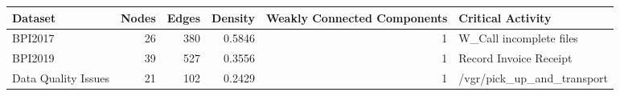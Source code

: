 \begin{tabular}{lrrrrl}
\toprule
Dataset & Nodes & Edges & Density & Weakly Connected Components & Critical Activity \\
\midrule
BPI2017 & 26 & 380 & 0.5846 & 1 & W_Call incomplete files \\
BPI2019 & 39 & 527 & 0.3556 & 1 & Record Invoice Receipt \\
Data Quality Issues & 21 & 102 & 0.2429 & 1 & /vgr/pick_up_and_transport \\
\bottomrule
\end{tabular}
